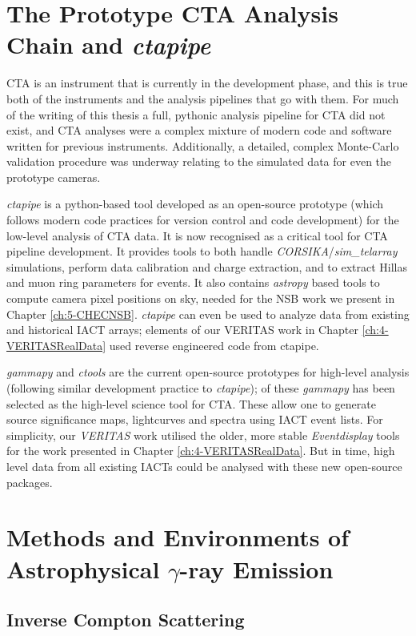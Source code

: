 \section{The Prototype CTA Analysis Chain and \textit{ctapipe}}

CTA is an instrument that is currently in the development phase, and this is true both of the instruments and the analysis pipelines that go with them. For much of the writing of this thesis a full, pythonic analysis pipeline for CTA did not exist, and CTA analyses were a complex mixture of modern code and software written for previous instruments. Additionally, a detailed, complex Monte-Carlo validation procedure was underway relating to the simulated data for even the prototype cameras.

\textit{ctapipe} is a python-based tool developed as an open-source prototype (which follows modern code practices for version control and code development) for the low-level analysis of CTA data. It is now recognised as a critical tool for CTA pipeline development. It provides tools to both handle \textit{CORSIKA}/\textit{sim\_telarray} simulations, perform data calibration and charge extraction, and to extract Hillas and muon ring parameters for events. It also contains \textit{astropy} based tools to compute camera pixel positions on sky, needed for the NSB work we present in Chapter \ref{ch:5-CHECNSB}. \textit{ctapipe} can even be used to analyze data from existing and historical IACT arrays; elements of our VERITAS work in Chapter \ref{ch:4-VERITASRealData} used reverse engineered code from ctapipe.

\textit{gammapy} and \textit{ctools} are the current open-source prototypes for high-level analysis (following similar development practice to \textit{ctapipe}); of these \textit{gammapy} has been selected as the high-level science tool for CTA. These allow one to generate source significance maps, lightcurves and spectra using IACT event lists. For simplicity, our \textit{VERITAS} work utilised the older, more stable \textit{Eventdisplay} tools for the work presented in Chapter \ref{ch:4-VERITASRealData}. But in time, high level data from all existing IACTs could be analysed with these new open-source packages.

\section{Methods and Environments of Astrophysical \ensuremath{\gamma}-ray Emission}
\subsection{Inverse Compton Scattering}

